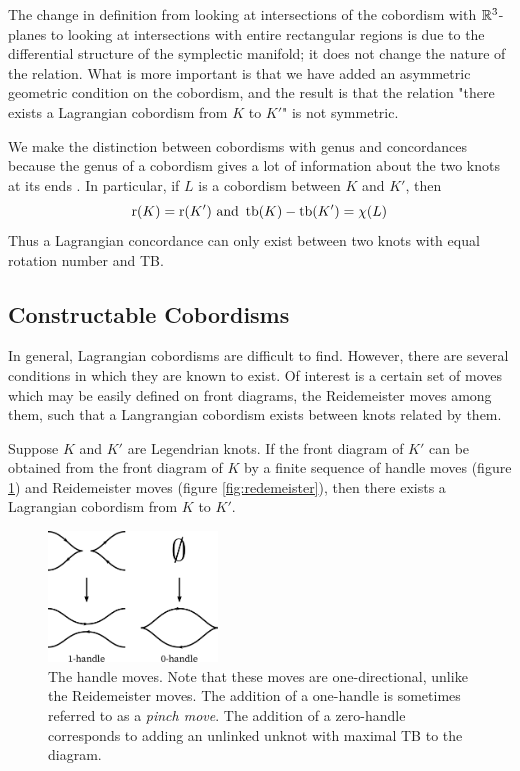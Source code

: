 The change in definition from looking at intersections of the cobordism with $\mathbb{R}^3$-planes to looking at intersections with entire rectangular regions is due to the differential structure of the symplectic manifold; it does not change the nature of the relation. What is more important is that we have added an asymmetric geometric condition on the cobordism, and the result is that the relation "there exists a Lagrangian cobordism from $K$ to $K'$" is not symmetric.

We make the distinction between cobordisms with genus and concordances because the genus of a cobordism gives a lot of information about the two knots at its ends \cite{chantraine2010}. In particular, if $L$ is a cobordism between $K$ and $K'$, then
\[
    \operatorname{r}(K) = \operatorname{r}(K') \text{     and     } \operatorname{tb}(K) - \operatorname{tb}(K') = \chi(L)
\]
Thus a Lagrangian concordance can only exist between two knots with equal rotation number and TB.


\subsection{Constructable Cobordisms}

In general, Lagrangian cobordisms are difficult to find. However, there are several conditions in which they are known to exist. Of interest is a certain set of moves which may be easily defined on front diagrams, the Reidemeister moves among them, such that a Langrangian cobordism exists between knots related by them.

\begin{theorem}
    Suppose $K$ and $K'$ are Legendrian knots. If the front diagram of $K'$ can be obtained from the front diagram of $K$ by a finite sequence of handle moves (figure \ref{fig:handles}) and Reidemeister moves (figure \ref{fig:redemeister}), then there exists a Lagrangian cobordism from $K$ to $K'$. 
\end{theorem}
\begin{figure}[ht!]
    \centering
    \includegraphics[width=0.4\textwidth]{images/handles.pdf}
    \caption{The handle moves. Note that these moves are one-directional, unlike the Reidemeister moves. The addition of a one-handle is sometimes referred to as a \emph{pinch move}. The addition of a zero-handle corresponds to adding an unlinked unknot with maximal TB to the diagram.}
    \label{fig:handles}
\end{figure}

